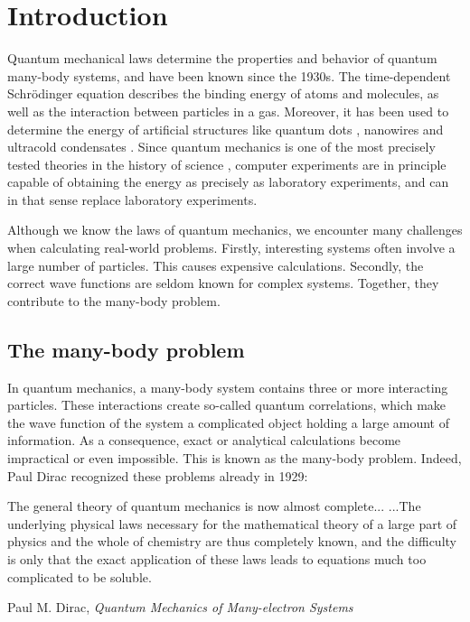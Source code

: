 \chapter{Introduction}
Quantum mechanical laws determine the properties and behavior of quantum many-body systems, and have been known since the 1930s. The time-dependent Schrödinger equation describes the binding energy of atoms and molecules, as well as the interaction between particles in a gas. Moreover, it has been used to determine the energy of artificial structures like quantum dots \supercite{reimann_electronic_2002}, nanowires \supercite{wang_a_three_2004} and ultracold condensates \supercite{dubois_bose-einstein_2001}. Since quantum mechanics is one of the most precisely tested theories in the history of science \supercite{odom_new_2006}, computer experiments are in principle capable of obtaining the energy as precisely as laboratory experiments, and can in that sense replace laboratory experiments.

Although we know the laws of quantum mechanics, we encounter many challenges when calculating real-world problems. Firstly, interesting systems often involve a large number of particles. This causes expensive calculations. Secondly, the correct wave functions are seldom known for complex systems. Together, they contribute to the many-body problem.

\section{The many-body problem}
In quantum mechanics, a many-body system contains three or more interacting particles. These interactions create so-called quantum correlations, which make the wave function of the system a complicated object holding a large amount of information. As a consequence, exact or analytical calculations become impractical or even impossible. This is known as the many-body problem. Indeed, Paul Dirac recognized these problems already in 1929:

\begin{shadequote}{
		The general theory of quantum mechanics is now almost complete... ...The underlying physical laws necessary for the mathematical theory of a large part of physics and the whole of chemistry are thus completely known, and the difficulty is only that the exact application of these laws leads to equations much too complicated to be soluble. \par Paul M. Dirac, \emph{Quantum Mechanics of Many-electron Systems} \supercite{dirac_paul_adrien_maurice_quantum_1929}}
\end{shadequote}


